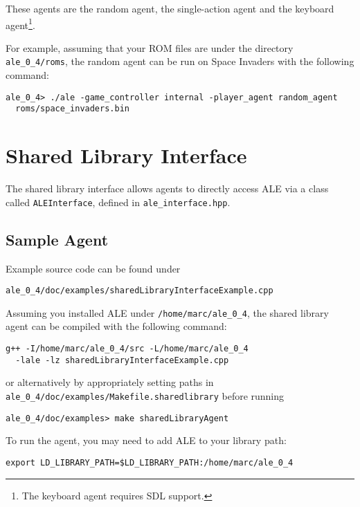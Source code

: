 \documentclass[12pt]{article}
\begin{document}
These agents are the random agent, the single-action agent and the keyboard agent\footnote{The keyboard agent requires SDL support.}.

For example, assuming that your ROM files are under the directory \verb+ale_0_4/roms+, the
random agent can be run on Space Invaders with the following command:

\begin{verbatim}
ale_0_4> ./ale -game_controller internal -player_agent random_agent  
  roms/space_invaders.bin
\end{verbatim}

\section{Shared Library Interface}\label{sec:shared_library_interface}

The shared library interface allows agents to directly access ALE via a class called
\verb+ALEInterface+, defined in \verb+ale_interface.hpp+. 

\subsection{Sample Agent}

Example source code can be found under

\begin{verbatim}
ale_0_4/doc/examples/sharedLibraryInterfaceExample.cpp
\end{verbatim}

Assuming you installed ALE under \verb+/home/marc/ale_0_4+, the shared library agent can be 
compiled with the following command: 

\begin{verbatim}
g++ -I/home/marc/ale_0_4/src -L/home/marc/ale_0_4 
  -lale -lz sharedLibraryInterfaceExample.cpp 
\end{verbatim}

or alternatively by appropriately setting paths in \verb+ale_0_4/doc/examples/Makefile.sharedlibrary+ before running 

\begin{verbatim}
ale_0_4/doc/examples> make sharedLibraryAgent
\end{verbatim}

To run the agent, you may need to add ALE to your library path:

\begin{verbatim}
export LD_LIBRARY_PATH=$LD_LIBRARY_PATH:/home/marc/ale_0_4
\end{verbatim}
\end{document}
